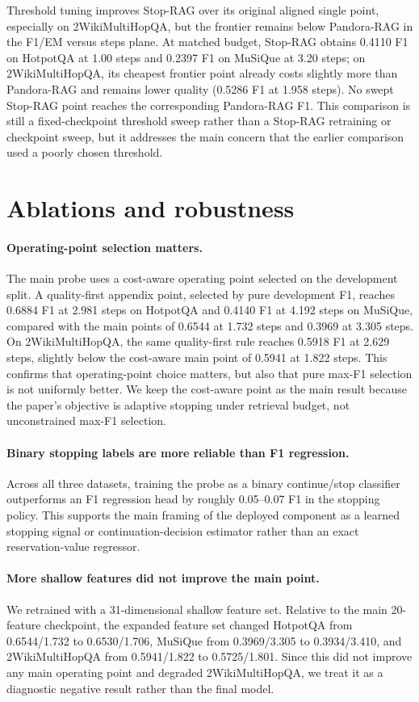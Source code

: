 \documentclass{article}
\newcommand{\method}{Pandora-RAG}
\newcommand{\hotpot}{HotpotQA}
\newcommand{\musique}{MuSiQue}
\newcommand{\twowiki}{2WikiMultiHopQA}
\begin{document}
Threshold tuning improves Stop-RAG over its original aligned single point, especially on \twowiki{}, but the frontier remains below \method{} in the F1/EM versus steps plane. At matched budget, Stop-RAG obtains 0.4110 F1 on \hotpot{} at 1.00 steps and 0.2397 F1 on \musique{} at 3.20 steps; on \twowiki{}, its cheapest frontier point already costs slightly more than \method{} and remains lower quality (0.5286 F1 at 1.958 steps). No swept Stop-RAG point reaches the corresponding \method{} F1. This comparison is still a fixed-checkpoint threshold sweep rather than a Stop-RAG retraining or checkpoint sweep, but it addresses the main concern that the earlier comparison used a poorly chosen threshold.

\section{Ablations and robustness}
\label{sec:ablations}

\paragraph{Operating-point selection matters.}
The main probe uses a cost-aware operating point selected on the development split. A quality-first appendix point, selected by pure development F1, reaches 0.6884 F1 at 2.981 steps on \hotpot{} and 0.4140 F1 at 4.192 steps on \musique{}, compared with the main points of 0.6544 at 1.732 steps and 0.3969 at 3.305 steps. On \twowiki{}, the same quality-first rule reaches 0.5918 F1 at 2.629 steps, slightly below the cost-aware main point of 0.5941 at 1.822 steps. This confirms that operating-point choice matters, but also that pure max-F1 selection is not uniformly better. We keep the cost-aware point as the main result because the paper's objective is adaptive stopping under retrieval budget, not unconstrained max-F1 selection.

\paragraph{Binary stopping labels are more reliable than F1 regression.}
Across all three datasets, training the probe as a binary continue/stop classifier outperforms an F1 regression head by roughly 0.05--0.07 F1 in the stopping policy. This supports the main framing of the deployed component as a learned stopping signal or continuation-decision estimator rather than an exact reservation-value regressor.

\paragraph{More shallow features did not improve the main point.}
We retrained with a 31-dimensional shallow feature set. Relative to the main 20-feature checkpoint, the expanded feature set changed \hotpot{} from 0.6544/1.732 to 0.6530/1.706, \musique{} from 0.3969/3.305 to 0.3934/3.410, and \twowiki{} from 0.5941/1.822 to 0.5725/1.801. Since this did not improve any main operating point and degraded \twowiki{}, we treat it as a diagnostic negative result rather than the final model.
\end{document}
